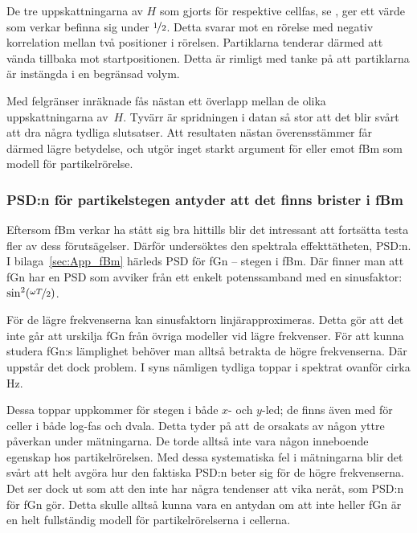 De tre uppskattningarna av $H$ som gjorts för respektive cellfas, se , ger ett värde som verkar befinna sig under $\nicefrac{1}{2}$. Detta svarar mot en rörelse med negativ korrelation mellan två positioner i rörelsen. Partiklarna tenderar därmed att vända tillbaka mot startpositionen. Detta är rimligt med tanke på att partiklarna är instängda i en begränsad volym.

Med felgränser inräknade fås nästan ett överlapp mellan de olika uppskattningarna av~$H$. Tyvärr är spridningen i datan så stor att det blir svårt att dra några tydliga slutsatser. 
Att resultaten nästan överensstämmer får därmed lägre betydelse, och utgör inget starkt argument för eller emot fBm som modell för partikelrörelse.


\subsubsection{PSD:n för partikelstegen antyder att det finns brister i fBm}

Eftersom fBm verkar ha stått sig bra hittills blir det intressant att fortsätta testa fler av dess förutsägelser. Därför undersöktes den spektrala effekttätheten, PSD:n. I bilaga~\ref{sec:App_fBm} härleds PSD för fGn -- stegen i fBm. Där finner man att fGn har en PSD som avviker från ett enkelt potenssamband med en sinusfaktor: $\sin^2(\nicefrac{\omega T}{2})$. 

För de lägre frekvenserna kan sinusfaktorn linjärapproximeras. Detta gör att det inte går att urskilja fGn från övriga modeller vid lägre frekvenser.
För att kunna studera fGn:s lämplighet behöver man alltså betrakta de högre frekvenserna. Där uppstår det dock problem. I  syns nämligen tydliga toppar i spektrat ovanför cirka \unit[20]{Hz}.

Dessa toppar uppkommer för stegen i både $x$- och $y$-led; de finns även med för celler i både log-fas och dvala. Detta tyder på att de orsakats av någon yttre påverkan under mätningarna. De torde alltså inte vara någon inneboende egenskap hos partikelrörelsen.
Med dessa systematiska fel i mätningarna blir det svårt att helt avgöra hur den faktiska PSD:n beter sig för de högre frekvenserna. Det ser dock ut som att den inte har några tendenser att vika neråt, som PSD:n för fGn gör. Detta skulle alltså kunna vara en antydan om att inte heller fGn är en helt fullständig modell för partikelrörelserna i cellerna. 


